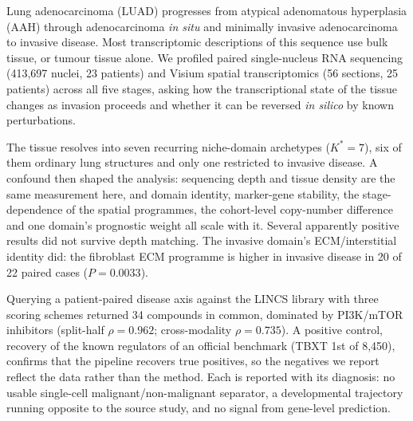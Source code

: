 Lung adenocarcinoma (LUAD) progresses from atypical adenomatous hyperplasia (AAH) through
adenocarcinoma \emph{in situ} and minimally invasive adenocarcinoma to invasive disease.
Most transcriptomic descriptions of this sequence use bulk tissue, or tumour tissue alone.
We profiled paired single-nucleus RNA sequencing (413,697 nuclei, 23 patients) and Visium
spatial transcriptomics (56 sections, 25 patients) across all five stages, asking how the
transcriptional state of the tissue changes as invasion proceeds and whether it can be
reversed \emph{in silico} by known perturbations.

The tissue resolves into seven recurring niche-domain archetypes ($K^{*}=7$), six of them
ordinary lung structures and only one restricted to invasive disease. A confound then shaped
the analysis: sequencing depth and tissue density are the same measurement here, and domain
identity, marker-gene stability, the stage-dependence of the spatial programmes, the
cohort-level copy-number difference and one domain's prognostic weight all scale with it.
Several apparently positive results did not survive depth matching. The invasive domain's
ECM/interstitial identity did: the fibroblast ECM programme is higher in invasive disease in
20 of 22 paired cases ($P=0.0033$).

Querying a patient-paired disease axis against the LINCS library with three scoring schemes
returned 34 compounds in common, dominated by PI3K/mTOR inhibitors (split-half
$\rho=0.962$; cross-modality $\rho=0.735$). A positive control, recovery of the known
regulators of an official benchmark (TBXT 1st of 8,450), confirms that the pipeline recovers
true positives, so the negatives we report reflect the data rather than the method. Each is
reported with its diagnosis: no usable single-cell malignant/non-malignant separator, a
developmental trajectory running opposite to the source study, and no signal from gene-level
prediction.
